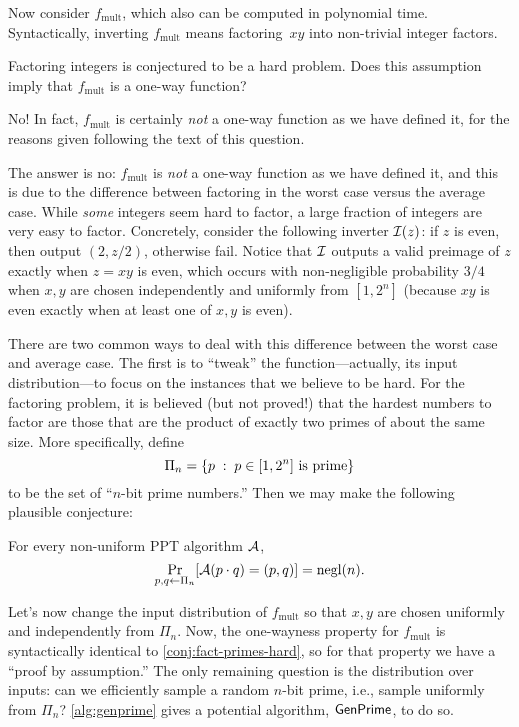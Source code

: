 \documentclass[11pt]{article}
\begin{document}
Now consider $f_{\text{mult}}$, which also can be computed in
polynomial time. Syntactically, inverting $f_{\text{mult}}$ means
factoring~$xy$ into non-trivial integer factors.

\begin{question}
  Factoring integers is conjectured to be a hard problem. Does this
  assumption imply that \(f_{\text{mult}}\) is a one-way function?
\end{question}

\begin{answer}
  No! In fact, \(f_{\text{mult}}\) is certainly \emph{not} a one-way
  function as we have defined it, for the reasons given following the
  text of this question.
\end{answer}

The answer is no: \(f_{\text{mult}}\) is \emph{not} a one-way function
as we have defined it, and this is due to the difference between
factoring in the worst case versus the average case. While \emph{some}
integers seem hard to factor, a large fraction of integers are very
easy to factor. Concretely, consider the following inverter $\mathcal{I}(z)$:
if $z$ is even, then output $(2, z/2)$, otherwise fail.  Notice that
$\mathcal{I}$ outputs a valid preimage of $z$ exactly when $z = xy$ is even,
which occurs with non-negligible probability $3/4$ when $x, y$ are
chosen independently and uniformly from $[1,2^{n}]$ (because $xy$ is
even exactly when at least one of $x,y$ is even).

There are two common ways to deal with this difference between the
worst case and average case.  The first is to ``tweak'' the
function---actually, its input distribution---to focus on the
instances that we believe to be hard.  For the factoring problem, it
is believed (but not proved!) that the hardest numbers to factor are
those that are the product of exactly two primes of about the same
size.  More specifically, define
\[ \Pi_{n} = \{ p\; :\; p \in [1,2^{n}] \text{ is prime}\} \] to be
the set of ``$n$-bit prime numbers.''  Then we may make the following
plausible conjecture:

\begin{conjecture}
  \label{conj:fact-primes-hard}
  For every non-uniform PPT algorithm $\mathcal{A}$,
  \[ \Pr_{p,q \gets \Pi_{n}} [\mathcal{A}(p \cdot q) = (p,q)] = \operatorname{negl}(n). \]
\end{conjecture}

Let's now change the input distribution of $f_{\text{mult}}$ so that
$x,y$ are chosen uniformly and independently from $\Pi_{n}$.  Now, the
one-wayness property for $f_{\text{mult}}$ is syntactically identical
to \cref{conj:fact-primes-hard}, so for that property we
have a ``proof by assumption.''  The only remaining question is the
distribution over inputs: can we efficiently sample a random $n$-bit
prime, i.e., sample uniformly from $\Pi_{n}$?
\cref{alg:genprime} gives a potential algorithm,
$\mathsf{GenPrime}$, to do so.
\end{document}
